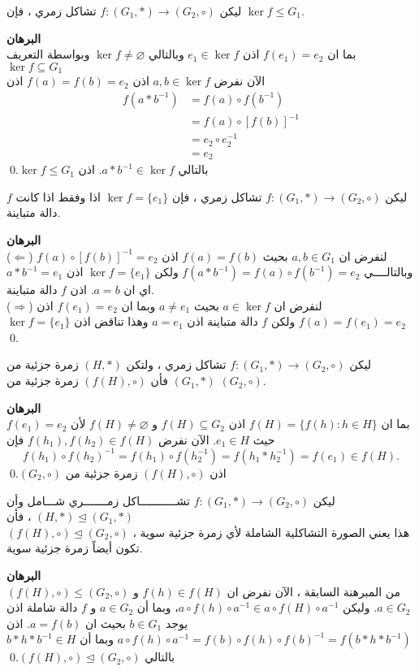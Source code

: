 	\begin{theorem}
			ليكن 	$f : (G_1, *) \to (G_2, \circ)$ تشاكل زمري ، فإن $\ker f\leq G_1$.
	\end{theorem}
	\noindent
	\textbf{البرهان}\\
	\noindent
	بما ان $f(e_1) = e_2$ اذن $e_1\in \ker f$ وبالتالي $\ker f\neq \varnothing$ وبواسطة التعريف $\ker f \subseteq G_1$ \\
	الآن نفرض $a, b\in \ker f$ اذن $f(a) = f(b) = e_2$ اذن
	\begin{align*}
		f(a * b^{-1}) &= f(a) \circ f(b^{-1})\\
		&= f(a) \circ  [f(b)]^{-1}\\
		&= e_2 \circ  e_2^{-1}\\
		&= e_2
	\end{align*}
	بالتالي $a * b^{-1} \in \ker f$. اذن $\ker f\leq G_1$.\qed
	
	\begin{theorem}
					ليكن 	$f : (G_1, *) \to (G_2, \circ)$ تشاكل زمري ، فإن $\ker f=\{e_1\}$ اذا وفقط اذا كانت $f$ دالة متباينة.
	\end{theorem}
	\noindent
	\textbf{البرهان}\\
	\noindent
	($\Leftarrow$) لنفرض ان $a, b\in G_1$ بحيث $f(a) = f(b)$ اذن $f(a) \circ [f(b)]^{-1} = e_2$ وبالتالــــي $f(a * b^{-1}) = f(a) \circ f(b^{-1}) = e_2$ ولكن $\ker f = \{e_1\}$ اذن $a*b^{-1} = e_1$ اي ان $a = b$. اذن $f$ دالة متباينة.\\
	($\Rightarrow$) لنفرض ان $a \in \ker f$ بحيث $a\neq e_1$ وبما ان $f(e_1) = e_2$ اذن $f(a) = f(e_1) = e_2$ ولكن $f$ دالة متباينة اذن $a = e_1$ وهذا تناقض اذن $\ker f = \{e_1\}$.\qed
	\newpage
	\begin{theorem}
	ليكن 	$f : (G_1, *) \to (G_2, \circ)$ تشاكل زمري ، ولتكن $(H, *)$ زمرة جزئية من 
	$(G_1, *)$ فأن $(f(H), \circ )$ زمرة جزئية من $(G_2, \circ)$.
	\end{theorem}
	\noindent
	\textbf{البرهان}\\
	\noindent
	بما ان
	$f(H) = \{ f(h) : h\in H\}$ اذن $f(H) \subseteq G_2$ و $f(H) \neq \varnothing$ لأن $f(e_1) = e_2$ حيث $e_1 \in H$. الآن نفرض $f(h_1) , f(h_2) \in f(H)$ فإن 
	\[
	f(h_1) \circ f(h_2)^{-1} = f(h_1) \circ f(h_2^{-1}) = f(h_1 * h_2^{-1} )  = f(e_1)\in f(H). 
 	\]
 	اذن $(f(H), \circ )$ زمرة جزئية من $(G_2, \circ)$.\qed
 	
 	\begin{theorem}
 ليكن $f : (G_1, *) \to (G_2, \circ)$ تشـــــــــــاكل زمـــــــري شـــامل وأن 
 $(H, *) \trianglelefteq (G_1, *)$ ، فأن\\
 $(f(H), \circ) \trianglelefteq (G_2, \circ)$
 ، هذا يعني الصورة التشاكلية الشاملة لأي زمرة جزئية سوية تكون أيضاً زمرة جزئية سوية.
 	\end{theorem}
\noindent
\textbf{البرهان}\\
\noindent
 $(f(H), \circ) \leq (G_2, \circ)$ من المبرهنة السابقة ، الآن نفرض ان $f(h) \in f(H)$ و $a\in G_2$. وليكن $a\circ f(h) \circ a^{-1} \in a \circ f(H) \circ a^{-1}$، وبما أن $a\in G_2$ و $f$ دالة شاملة اذن يوجد $b\in G_1$ بحيث ان $a = f(b)$.  اذن
 $
 a\circ f(h) \circ a^{-1}= f(b) \circ f(h) \circ f(b)^{-1} = f(b*h*b^{-1})
 $
 وبما أن
 $b * h * b^{-1} \in H$ بالتالي $(f(H), \circ) \trianglelefteq (G_2, \circ)$.\qed
 
